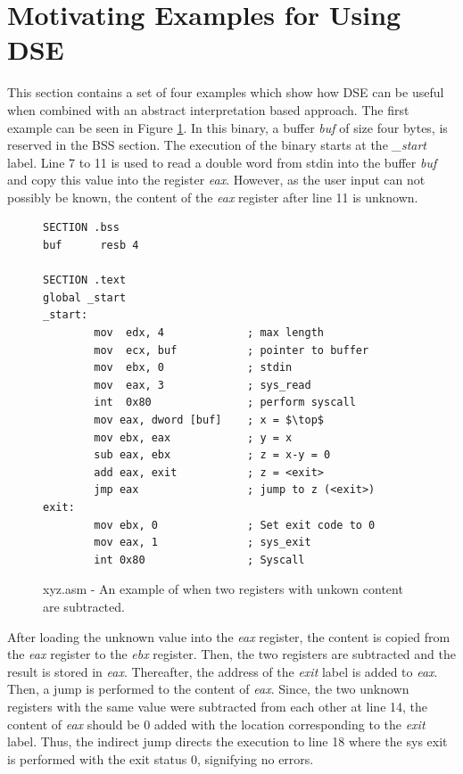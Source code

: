 \documentclass{kththesis}
\newcommand{\fbcomment}[1]{{#1}}
\renewcommand{\fbcomment}[1]{}
\renewcommand{\it}[1]{\textit{#1}}
\begin{document}
\section{Motivating Examples for Using DSE}\label{sec:MotExamples}
\fbcomment{\color{red}Goal: Provide 4 examples of when DSE can be useful. (Ex 1: A case that can be handled by DSE but not Jakstab. Ex 2: Why it is important to alternate multiple times between under and over-approximation, Ex 3: Why the second version has higher soundness. Ex 4: That the under-approximation can be useful even when there is a true top in a binary)}
This section contains a set of four examples which show how DSE can be useful when combined with an abstract interpretation based approach. The first example can be seen in Figure \ref{fig:xyz.asm}. In this binary, a buffer \it{buf} of size four bytes, is reserved in the BSS section. The execution of the binary starts at the \it{\_start} label. Line 7 to 11 is used to read a double word from stdin into the buffer \it{buf} and copy this value into the register \it{eax}. However, as the user input can not possibly be known, the content of the \it{eax} register after line 11 is unknown.
\begin{figure}[!th]
    \centering
\begin{tcolorbox}
\begin{verbatim}
SECTION .bss
buf      resb 4

SECTION .text
global _start
_start:
        mov  edx, 4             ; max length
        mov  ecx, buf           ; pointer to buffer
        mov  ebx, 0             ; stdin
        mov  eax, 3             ; sys_read
        int  0x80               ; perform syscall
        mov eax, dword [buf]    ; x = $\top$
        mov ebx, eax            ; y = x
        sub eax, ebx            ; z = x-y = 0
        add eax, exit           ; z = <exit>
        jmp eax                 ; jump to z (<exit>)
exit:
        mov ebx, 0              ; Set exit code to 0
        mov eax, 1              ; sys_exit
        int 0x80                ; Syscall
\end{verbatim}
\end{tcolorbox}
\caption{xyz.asm - An example of when two registers with unkown content are subtracted.}
    \label{fig:xyz.asm}
\end{figure}
\noindent
After loading the unknown value into the \it{eax} register, the content is copied from the \it{eax} register to the \it{ebx} register. Then, the two registers are subtracted and the result is stored in \it{eax}. Thereafter, the address of the \it{exit} label is added to \it{eax}. Then, a jump is performed to the content of \it{eax}. Since, the two unknown registers with the same value were subtracted from each other at line 14, the content of \it{eax} should be $0$ added with the location corresponding to the \it{exit} label. Thus, the indirect jump directs the execution to line 18 where the sys exit is performed with the exit status $0$, signifying no errors.
\end{document}
